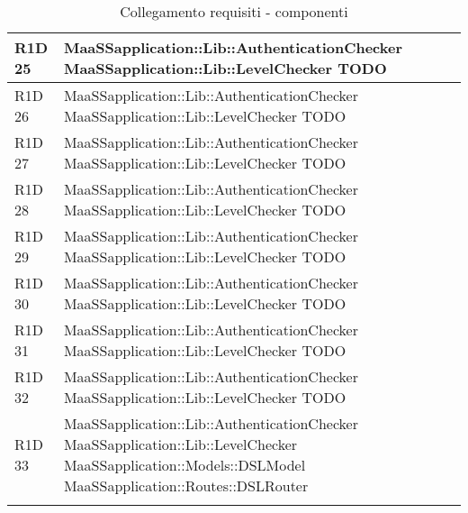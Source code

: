 \begin{center}
\begin{longtable}{ | l | p{8cm} |}
    R1D 25 & MaaSSapplication::Lib::AuthenticationChecker \newline MaaSSapplication::Lib::LevelChecker \newline  TODO \\ \hline

    R1D 26 & MaaSSapplication::Lib::AuthenticationChecker \newline MaaSSapplication::Lib::LevelChecker \newline  TODO \\ \hline
    
    R1D 27 & MaaSSapplication::Lib::AuthenticationChecker \newline MaaSSapplication::Lib::LevelChecker \newline  TODO \\ \hline
    
    R1D 28 & MaaSSapplication::Lib::AuthenticationChecker \newline MaaSSapplication::Lib::LevelChecker \newline  TODO \\ \hline
    
    R1D 29 & MaaSSapplication::Lib::AuthenticationChecker \newline MaaSSapplication::Lib::LevelChecker \newline  TODO \\ \hline
    
    R1D 30 & MaaSSapplication::Lib::AuthenticationChecker \newline MaaSSapplication::Lib::LevelChecker \newline  TODO \\ \hline

    R1D 31 & MaaSSapplication::Lib::AuthenticationChecker \newline MaaSSapplication::Lib::LevelChecker \newline  TODO \\ \hline
    
    R1D 32 & MaaSSapplication::Lib::AuthenticationChecker \newline MaaSSapplication::Lib::LevelChecker \newline  TODO \\ \hline
        
    R1D 33 & MaaSSapplication::Lib::AuthenticationChecker \newline MaaSSapplication::Lib::LevelChecker \newline  MaaSSapplication::Models::DSLModel \newline MaaSSapplication::Routes::DSLRouter \\ \hline
        
    \caption{Collegamento requisiti - componenti}
  \end{longtable}
  \egroup
\end{center} 